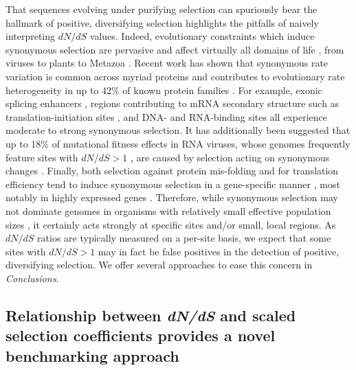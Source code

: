 \documentclass[11pt]{article}
\begin{document}
That sequences evolving under purifying selection can spuriously bear the hallmark of positive, diversifying selection highlights the pitfalls of naively interpreting $dN/dS$ values. Indeed, evolutionary constraints which induce synonymous selection are pervasive and affect virtually all domains of life \citep{GuZhouWilke2010}, from viruses \citep{ZhouWilke2011,Cuevasetal2011,ZaniniNeher2013} to plants \citep{Guetal2012} to Metazoa \citep{Duret2002,Chamaryetal2006,HershbergPetrov2008,PlotkinKudla2010,Lawrieetal2013}. 
Recent work has shown that synonymous rate variation is common across myriad proteins and contributes to evolutionary rate heterogeneity in up to 42\% of known protein families \citep{Dimitrieva2014}. For example, exonic splicing enhancers \citep{Schattner2006,Parmleyetal2006,ParmleyHurst2007}, regions contributing to mRNA secondary structure such as translation-initiation sites \citep{Chamaryetal2005,Schattner2006,GuZhouWilke2010,Cuevasetal2011,ZaniniNeher2013}, and DNA- and RNA-binding sites \citep{Parmleyetal2006} all experience moderate to strong synonymous selection. It has additionally been suggested that up to 18\% of mutational fitness effects in RNA viruses, whose genomes frequently feature sites with $dN/dS > 1$ \citep{Bushetal1999,Suzuki2006,Bhattetal2011,Meyeretal2013,MeyerWilke2013}, are caused by selection acting on synonymous changes \citep{Cuevasetal2011}. Finally, both selection against protein mis-folding and for translation efficiency tend to induce synonymous selection in a gene-specific manner \citep{WillifordDemuth2012,Agasheetal2013}, most notably in highly expressed genes \citep{DrummondWilke2008,Lawrieetal2013}. Therefore, while synonymous selection may not dominate genomes in organisms with relatively small effective population sizes \citep{Chamaryetal2006, PlotkinKudla2010}, it certainly acts strongly at specific sites and/or small, local regions. As $dN/dS$ ratios are typically measured on a per-site basis, we expect that some sites with $dN/dS > 1$ may in fact be false positives in the detection of positive, diversifying selection. We offer several approaches to ease this concern in \emph{Conclusions}.



\subsection*{Relationship between \emph{dN/dS} and scaled selection coefficients provides a novel benchmarking approach}
\end{document}
